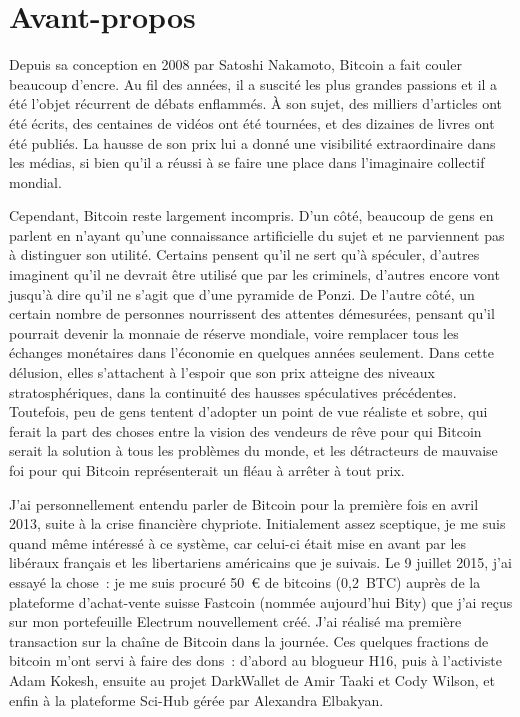 
\chapter*{Avant-propos}

Depuis sa conception en 2008 par Satoshi Nakamoto, Bitcoin a fait couler beaucoup d'encre. Au fil des années, il a suscité les plus grandes passions et il a été l'objet récurrent de débats enflammés. À son sujet, des milliers d'articles ont été écrits, des centaines de vidéos ont été tournées, et des dizaines de livres ont été publiés. La hausse de son prix lui a donné une visibilité extraordinaire dans les médias, si bien qu'il a réussi à se faire une place dans l'imaginaire collectif mondial.

Cependant, Bitcoin reste largement incompris. D'un côté, beaucoup de gens en parlent en n'ayant qu'une connaissance artificielle du sujet et ne parviennent pas à distinguer son utilité. Certains pensent qu'il ne sert qu'à spéculer, d'autres imaginent qu'il ne devrait être utilisé que par les criminels, d'autres encore vont jusqu'à dire qu'il ne s'agit que d'une pyramide de Ponzi. De l'autre côté, un certain nombre de personnes nourrissent des attentes démesurées, pensant qu'il pourrait devenir la monnaie de réserve mondiale, voire remplacer tous les échanges monétaires dans l'économie en quelques années seulement. Dans cette délusion, elles s'attachent à l'espoir que son prix atteigne des niveaux stratosphériques, dans la continuité des hausses spéculatives précédentes. Toutefois, peu de gens tentent d'adopter un point de vue réaliste et sobre, qui ferait la part des choses entre la vision des vendeurs de rêve pour qui Bitcoin serait la solution à tous les problèmes du monde, et les détracteurs de mauvaise foi pour qui Bitcoin représenterait un fléau à arrêter à tout prix.

J'ai personnellement entendu parler de Bitcoin pour la première fois en avril 2013, suite à la crise financière chypriote. Initialement assez sceptique, je me suis quand même intéressé à ce système, car celui-ci était mise en avant par les libéraux français et les libertariens américains que je suivais. Le 9 juillet 2015, j'ai essayé la chose~: je me suis procuré 50~\euro{} de bitcoins (0,2~BTC) auprès de la plateforme d'achat-vente suisse Fastcoin (nommée aujourd'hui Bity) que j'ai reçus sur mon portefeuille Electrum nouvellement créé. J'ai réalisé ma première transaction sur la chaîne de Bitcoin dans la journée. Ces quelques fractions de bitcoin m'ont servi à faire des dons~: d'abord au blogueur H16, puis à l'activiste Adam Kokesh, ensuite au projet DarkWallet de Amir Taaki et Cody Wilson, et enfin à la plateforme Sci-Hub gérée par Alexandra Elbakyan. %

